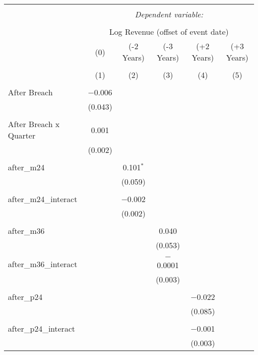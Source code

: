 
\begin{table}[!htbp] \centering 
  \caption{} 
  \label{} 
\begin{tabular}{@{\extracolsep{5pt}}lccccc} 
\\[-1.8ex]\hline 
\hline \\[-1.8ex] 
 & \multicolumn{5}{c}{\textit{Dependent variable:}} \\ 
\cline{2-6} 
\\[-1.8ex] & \multicolumn{5}{c}{Log Revenue (offset of event date)} \\ 
 & (0) & (-2 Years) & (-3 Years) & (+2 Years) & (+3 Years) \\ 
\\[-1.8ex] & (1) & (2) & (3) & (4) & (5)\\ 
\hline \\[-1.8ex] 
 After Breach & $-$0.006 &  &  &  &  \\ 
  & (0.043) &  &  &  &  \\ 
  & & & & & \\ 
 After Breach x Quarter & 0.001 &  &  &  &  \\ 
  & (0.002) &  &  &  &  \\ 
  & & & & & \\ 
 after\_m24 &  & 0.101$^{*}$ &  &  &  \\ 
  &  & (0.059) &  &  &  \\ 
  & & & & & \\ 
 after\_m24\_interact &  & $-$0.002 &  &  &  \\ 
  &  & (0.002) &  &  &  \\ 
  & & & & & \\ 
 after\_m36 &  &  & 0.040 &  &  \\ 
  &  &  & (0.053) &  &  \\ 
  & & & & & \\ 
 after\_m36\_interact &  &  & $-$0.0001 &  &  \\ 
  &  &  & (0.003) &  &  \\ 
  & & & & & \\ 
 after\_p24 &  &  &  & $-$0.022 &  \\ 
  &  &  &  & (0.085) &  \\ 
  & & & & & \\ 
 after\_p24\_interact &  &  &  & $-$0.001 &  \\ 
  &  &  &  & (0.003) &  \\ 

\end{tabular}
\end{table}
